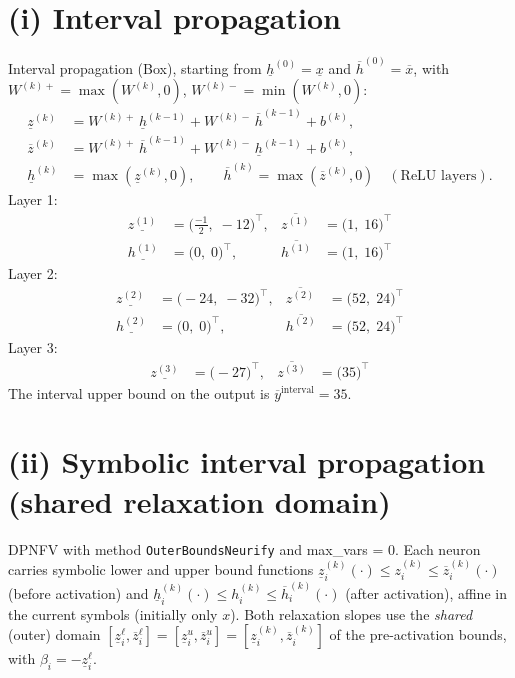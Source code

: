 \documentclass[11pt]{article}
\begin{document}
\section{(i) Interval propagation}
Interval propagation (Box), starting from $\underline{h}^{(0)} = \underline{x}$ and
$\overline{h}^{(0)} = \overline{x}$, with $W^{(k)+} = \max(W^{(k)}, 0)$,
$W^{(k)-} = \min(W^{(k)}, 0)$:
\begin{align*}
\underline{z}^{(k)} &= W^{(k)+}\, \underline{h}^{(k-1)} + W^{(k)-}\, \overline{h}^{(k-1)} + b^{(k)}, \\ 
\overline{z}^{(k)} &= W^{(k)+}\, \overline{h}^{(k-1)} + W^{(k)-}\, \underline{h}^{(k-1)} + b^{(k)}, \\ 
\underline{h}^{(k)} &= \max(\underline{z}^{(k)}, 0), \qquad \overline{h}^{(k)} = \max(\overline{z}^{(k)}, 0) \quad (\text{ReLU layers}).
\end{align*}
Layer 1:
\begin{align*}
\underline{z^{(1)}} &= \bigl(\frac{-1}{2},\; -12\bigr)^{\!\top}, & \overline{z^{(1)}} &= \bigl(1,\; 16\bigr)^{\!\top}
 \\
\underline{h^{(1)}} &= \bigl(0,\; 0\bigr)^{\!\top}, & \overline{h^{(1)}} &= \bigl(1,\; 16\bigr)^{\!\top}
\end{align*}
Layer 2:
\begin{align*}
\underline{z^{(2)}} &= \bigl(-24,\; -32\bigr)^{\!\top}, & \overline{z^{(2)}} &= \bigl(52,\; 24\bigr)^{\!\top}
 \\
\underline{h^{(2)}} &= \bigl(0,\; 0\bigr)^{\!\top}, & \overline{h^{(2)}} &= \bigl(52,\; 24\bigr)^{\!\top}
\end{align*}
Layer 3:
\begin{align*}
\underline{z^{(3)}} &= \bigl(-27\bigr)^{\!\top}, & \overline{z^{(3)}} &= \bigl(35\bigr)^{\!\top}
\end{align*}
The interval upper bound on the output is $\overline{y}^{\text{interval}} = 35$.

\section{(ii) Symbolic interval propagation (shared relaxation domain)}
DPNFV with method \texttt{OuterBoundsNeurify} and max\_vars = 0. Each neuron carries symbolic lower and upper bound functions
$\underline{z}^{(k)}_i(\cdot) \le z^{(k)}_i \le \overline{z}^{(k)}_i(\cdot)$ (before activation)
and $\underline{h}^{(k)}_i(\cdot) \le h^{(k)}_i \le \overline{h}^{(k)}_i(\cdot)$ (after activation),
affine in the current symbols (initially only $x$).
Both relaxation slopes use the \emph{shared} (outer) domain
$[\underline{z}^{\ell}_i, \overline{z}^{\ell}_i] = [\underline{z}^{u}_i, \overline{z}^{u}_i] = [\underline{z}^{(k)}_i, \overline{z}^{(k)}_i]$
of the pre-activation bounds, with $\beta_i = -\underline{z}^{\ell}_i$.
\end{document}
